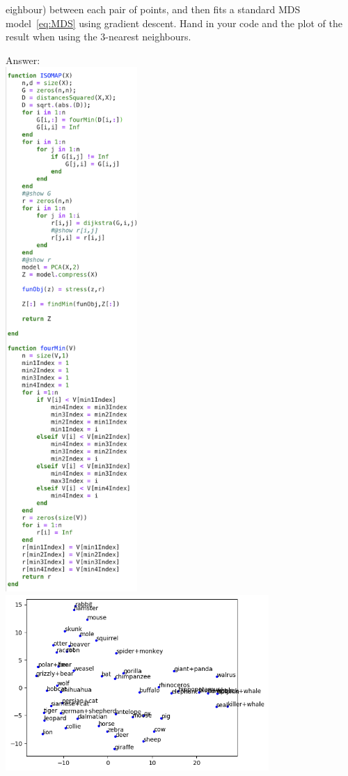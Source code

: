 \documentclass{article}
\def\ans#1{\par\gre{Answer: #1}}
\def\blu#1{{\color{blu}#1}}
\def\gre#1{{\color{gre}#1}}
\begin{document}
eighbour) between each pair of points, and then fits a standard MDS model~\eqref{eq:MDS} using gradient descent. \blu{Hand in your code and the plot of the result when using the $3$-nearest neighbours}.
\ans{\\
\includegraphics[width=5cm]{Q21.png} \\
\includegraphics[width=10cm]{Q21img.png}} \\
\end{document}
